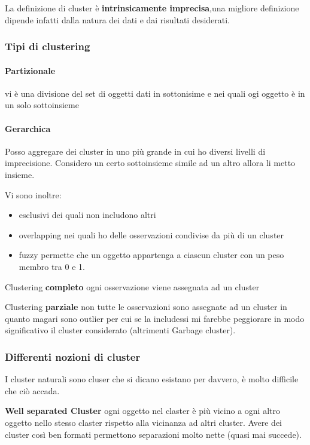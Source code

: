 La definizione di cluster è \textbf{intrinsicamente imprecisa},una migliore definizione dipende infatti dalla natura dei dati e dai risultati desiderati. 

\subsubsection{Tipi di clustering}

\paragraph{Partizionale}
vi \`e una divisione del set di oggetti dati in sottonisime e nei quali ogi oggetto \`e in un solo sottoinsieme

\paragraph{Gerarchica}
Posso aggregare dei cluster in uno pi\`u grande in cui ho diversi livelli di imprecisione. Considero un certo sottoinsieme simile ad un altro allora li metto insieme.

Vi sono inoltre:
\begin{itemize}
	\item esclusivi dei quali non includono altri
	\item overlapping nei quali ho delle osservazioni condivise da pi\`u di un cluster
	\item fuzzy permette che un oggetto appartenga a ciascun cluster con un peso membro tra 0 e 1.
\end{itemize}

Clustering \textbf{completo} ogni osservazione viene assegnata ad un cluster

Clustering \textbf{parziale} non tutte le osservazioni sono assegnate ad un cluster in quanto magari sono outlier per cui se la includessi mi farebbe peggiorare in modo significativo il cluster considerato (altrimenti Garbage cluster).

\subsubsection{Differenti nozioni di cluster}
I cluster naturali sono cluser che si dicano esistano per davvero, \`e molto difficile che ci\`o accada.

\textbf{Well separated Cluster} ogni oggetto nel claster \`e pi\`u vicino a ogni altro oggetto nello stesso claster rispetto alla vicinanza ad altri cluster. Avere dei cluster cos\`i ben formati permettono separazioni molto nette (quasi mai succede).

